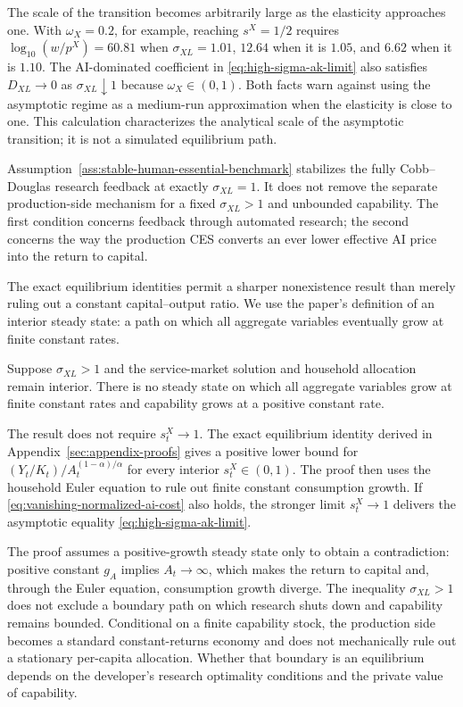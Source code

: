 The scale of the transition becomes arbitrarily large as the elasticity approaches
one. With $\omega_X=0.2$, for example, reaching $s^X=1/2$ requires
$\log_{10}(w/p^X)=60.81$ when $\sigma_{XL}=1.01$, $12.64$ when it is $1.05$, and
$6.62$ when it is $1.10$. The AI-dominated coefficient in
\eqref{eq:high-sigma-ak-limit} also satisfies
$D_{XL}\to0$ as $\sigma_{XL}\downarrow1$ because $\omega_X\in(0,1)$. Both facts
warn against using the asymptotic regime as a medium-run approximation when the
elasticity is close to one. This calculation characterizes the analytical scale of
the asymptotic transition; it is not a simulated equilibrium path.

Assumption~\ref{ass:stable-human-essential-benchmark} stabilizes the fully
Cobb--Douglas research feedback at exactly $\sigma_{XL}=1$. It does not remove the
separate production-side mechanism for a fixed $\sigma_{XL}>1$ and unbounded
capability. The first condition concerns feedback through automated research; the
second concerns the way the production CES converts an ever lower effective AI
price into the return to capital.

The exact equilibrium identities permit a sharper nonexistence result than merely
ruling out a constant capital--output ratio. We use the paper's definition of an
interior steady state: a path on which all aggregate variables eventually grow at
finite constant rates.

\newpage
\begin{proposition}
\label{prop:gross-substitution-no-steady-state}
Suppose $\sigma_{XL}>1$ and the service-market solution and household allocation
remain interior. There is no steady state on which all aggregate variables grow at
finite constant rates and capability grows at a positive constant rate.
\end{proposition}

The result does not require $s^X_t\to1$. The exact equilibrium identity derived in
Appendix~\ref{sec:appendix-proofs} gives a positive lower bound for
$(Y_t/K_t)/A_t^{(1-\alpha)/\alpha}$ for every interior $s^X_t\in(0,1)$. The proof
then uses the household Euler equation to rule out finite constant consumption
growth. If \eqref{eq:vanishing-normalized-ai-cost} also holds, the stronger limit
$s^X_t\to1$ delivers the asymptotic equality
\eqref{eq:high-sigma-ak-limit}.

The proof assumes a positive-growth steady state only to obtain a contradiction:
positive constant $g_A$ implies $A_t\to\infty$, which makes the return to capital and,
through the Euler equation, consumption growth diverge. The inequality
$\sigma_{XL}>1$ does not exclude a boundary path on which research shuts down and
capability remains bounded. Conditional on a finite capability stock, the production
side becomes a standard constant-returns economy and does not mechanically rule out
a stationary per-capita allocation. Whether that boundary is an equilibrium depends
on the developer's research optimality conditions and the private value of capability.

